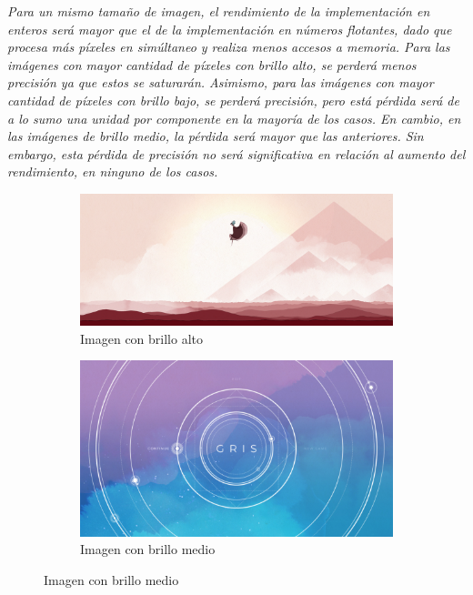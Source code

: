 \documentclass[a4paper]{article}
\begin{document}
\justify
\textit{Para un mismo tamaño de imagen, el rendimiento de la implementación en enteros será mayor que el de la implementación en números flotantes, dado que procesa más píxeles en simúltaneo y realiza menos accesos a memoria. Para las imágenes con mayor cantidad de píxeles con brillo alto, se perderá menos precisión ya que estos se saturarán. Asimismo, para las imágenes con mayor cantidad de píxeles con brillo bajo, se perderá precisión, pero está pérdida será de a lo sumo una unidad por componente en la mayoría de los casos. En cambio, en las imágenes de brillo medio, la pérdida será mayor que las anteriores. Sin embargo, esta pérdida de precisión no será significativa en relación al aumento del rendimiento, en ninguno de los casos.}\\
\justify   
\begin{figure}[h]
	\centering
	\begin{subfigure}[b]{0.3 \textwidth}
		\includegraphics[width=\textwidth]{img/bajo1.png}
		\caption{Imagen con brillo alto}
	\end{subfigure}
	\hfill
	\begin{subfigure}[b]{0.3 \textwidth}
		\includegraphics[width=\textwidth]{img/gris5.jpg}
		\caption{Imagen con brillo medio}
	\end{subfigure}

\end{figure}
\end{document}
